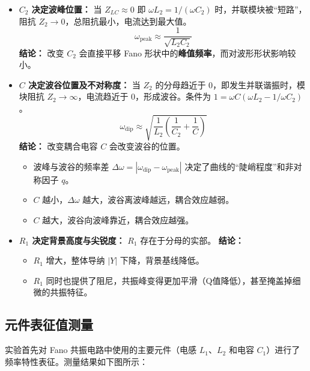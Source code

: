 \documentclass[12pt]{article}
\begin{document}
\begin{itemize}
    \item \textbf{$C_2$ 决定波峰位置：}
    当 $Z_{LC} \approx 0$ 即 $\omega L_2 = 1/(\omega C_2)$ 时，并联模块被“短路”，阻抗 $Z_2 \to 0$，总阻抗最小，电流达到最大值。
    \begin{equation}
        \omega_{\text{peak}} \approx \frac{1}{\sqrt{L_2 C_2}}
    \end{equation}
    \textbf{结论：} 改变 $C_2$ 会直接平移 Fano 形状中的\textbf{峰值频率}，而对波形形状影响较小。

    \item \textbf{$C$ 决定波谷位置及不对称度：}
    当 $Z_2$ 的分母趋近于 0，即发生并联谐振时，模块阻抗 $Z_2 \to \infty$，电流趋近于 0，形成波谷。条件为 $1 = \omega C (\omega L_2 - 1/\omega C_2)$。
    \begin{equation}
        \omega_{\text{dip}} \approx \sqrt{\frac{1}{L_2}(\frac{1}{C_2} + \frac{1}{C})}
    \end{equation}
    \textbf{结论：} 改变耦合电容 $C$ 会改变波谷的位置。
    \begin{itemize}
        \item 波峰与波谷的频率差 $\Delta \omega = |\omega_{\text{dip}} - \omega_{\text{peak}}|$ 决定了曲线的“陡峭程度”和非对称因子 $q$。
        \item $C$ 越小，$\Delta \omega$ 越大，波谷离波峰越远，耦合效应越弱。
        \item $C$ 越大，波谷向波峰靠近，耦合效应越强。
    \end{itemize}

    \item \textbf{$R_1$ 决定背景高度与尖锐度：}
    $R_1$ 存在于分母的实部。
    \textbf{结论：} 
    \begin{itemize}
        \item $R_1$ 增大，整体导纳 $|Y|$ 下降，背景基线降低。
        \item $R_1$ 同时也提供了阻尼，共振峰变得更加平滑（Q值降低），甚至掩盖掉细微的共振特征。
    \end{itemize}
\end{itemize}

\subsection{元件表征值测量}
\hspace{2em}
实验首先对 Fano 共振电路中使用的主要元件（电感 $L_1$、$L_2$ 和电容 $C_1$）进行了频率特性表征。测量结果如下图所示：
\end{document}

